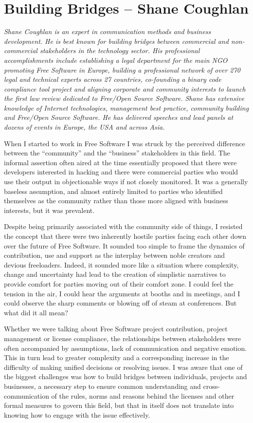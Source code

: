 \chapter{Building Bridges -- Shane Coughlan}

\textit{Shane Coughlan is an expert in communication methods and business
development. He is best known for building bridges between commercial and
non-commercial stakeholders in the technology sector. His professional
accomplishments include establishing a legal department for the main NGO
promoting Free Software in Europe, building a professional network of over 270
legal and technical experts across 27 countries, co-founding a binary code
compliance tool project and aligning corporate and community interests to launch
the first law review dedicated to Free/Open Source Software. Shane has extensive
knowledge of Internet technologies, management best practice, community building
and Free/Open Source Software. He has delivered speeches and lead panels at
dozens of events in Europe, the USA and across Asia.}

When I started to work in Free Software I was struck by the perceived difference
between the ``community'' and the ``business'' stakeholders in this field. The
informal assertion often aired at the time essentially proposed that there were
developers interested in hacking and there were commercial parties who would use
their output in objectionable ways if not closely monitored. It was a generally
baseless assumption, and almost entirely limited to parties who identified
themselves as the community rather than those more aligned with business
interests, but it was prevalent.

Despite being primarily associated with the community side of things, I resisted
the concept that there were two inherently hostile parties facing each other
down over the future of Free Software. It sounded too simple to frame the
dynamics of contribution, use and support as the interplay between noble
creators and devious freeloaders. Indeed, it sounded more like a situation where
complexity, change and uncertainty had lead to the creation of simplistic
narratives to provide comfort for parties moving out of their comfort zone. I
could feel the tension in the air, I could hear the arguments at booths and in
meetings, and I could observe the sharp comments or blowing off of steam at
conferences. But what did it all mean?

Whether we were talking about Free Software project contribution, project
management or license compliance, the relationships between stakeholders were
often accompanied by assumptions, lack of communication and negative emotion.
This in turn lead to greater complexity and a corresponding increase in the
difficulty of making unified decisions or resolving issues. I was aware that one
of the biggest challenges was how to build bridges between individuals, projects
and businesses, a necessary step to ensure common understanding and
cross-communication of the rules, norms and reasons behind the licenses and
other formal measures to govern this field, but that in itself does not
translate into knowing how to engage with the issue effectively.

